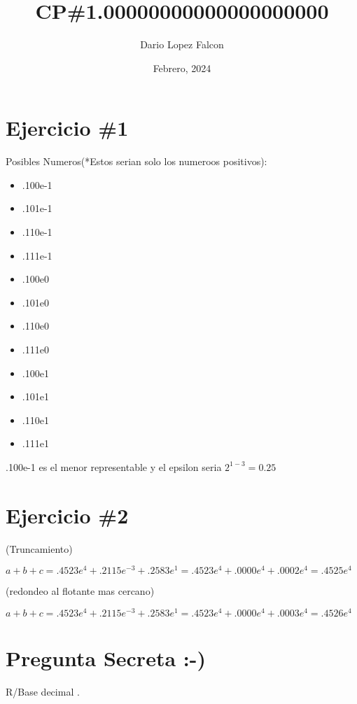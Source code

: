 \documentclass[a4paper,12pt]{article}
\begin{document}
\title{CP\#1.00000000000000000000}
\author{Dario Lopez Falcon}
\date{Febrero, 2024}
\maketitle

\section*{Ejercicio \#1}
Posibles Numeros(*Estos serian solo los numeroos positivos):
\begin{itemize}
    \item .100e-1 
    \item .101e-1 
    \item .110e-1
    \item .111e-1
    \item .100e0
    \item .101e0
    \item .110e0
    \item .111e0
    \item .100e1
    \item .101e1
    \item .110e1
    \item .111e1
\end{itemize}

.100e-1 es el menor representable y el epsilon seria $2^{1-3}=0.25$

\section*{Ejercicio \#2}

(Truncamiento)

\begin{center}
    $a+b+c=.4523e^4+.2115e^{-3}+.2583e^1=.4523e^4+.0000e^4+.0002e^4=.4525e^4$ 
\end{center}

\newpage

(redondeo al flotante mas cercano)

\begin{center}
    $a+b+c=.4523e^4+.2115e^{-3}+.2583e^1=.4523e^4+.0000e^4+.0003e^4=.4526e^4$ 
\end{center}

\section*{Pregunta Secreta :-)}

R/Base decimal .
\end{document}

